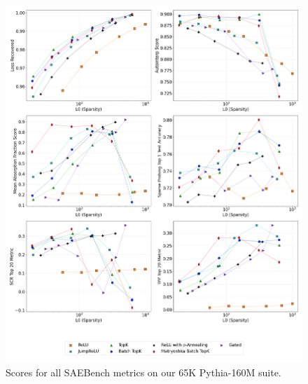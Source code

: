 \documentclass{article}
\theoremstyle{plain}
\theoremstyle{definition}
\theoremstyle{remark}
\begin{document}
\begin{figure}[h!]
    \centering
    \includegraphics[width=\columnwidth]{images/plot_2x4_sae_bench_pythia-160m_65k_architecture_series_layer_8.png}
    \caption{Scores for all SAEBench metrics on our 65K Pythia-160M suite.}
\end{figure}
\label{fig:plot_2x4_sae_bench_pythia-160m_65k_architecture_series_layer_8}
\end{document}
